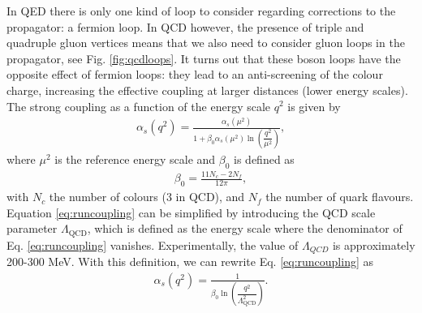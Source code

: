     In QED there is only one kind of loop to consider regarding corrections to the propagator: a fermion loop. In QCD however, the presence of triple and quadruple gluon vertices means that we also need to consider gluon loops in the propagator, see Fig. \ref{fig:qcdloops}. It turns out that these boson loops have the opposite effect of fermion loops: they lead to an anti-screening of the colour charge, increasing the effective coupling at larger distances (lower energy scales). The strong coupling as a function of the energy scale $q^2$ is given by 
    \begin{align}
      \alpha_s(q^2) = \frac{\alpha_s(\mu^2)}{1 + \beta_0\alpha_s(\mu^2)\ln\left(\dfrac{q^2}{\mu^2}\right)}, \label{eq:runcoupling}
    \end{align}
    where $\mu^2$ is the reference energy scale and $\beta_0$ is defined as
    \begin{align}
      \beta_0 = \frac{11N_c - 2N_f}{12\pi},  \label{eq:beta0}
    \end{align}
    with $N_c$ the number of colours (3 in QCD), and $N_f$ the number of quark flavours. Equation \ref{eq:runcoupling} can be simplified by introducing the QCD scale parameter $\Lambda_\text{QCD}$, which is defined as the energy scale where the denominator of Eq. \ref{eq:runcoupling} vanishes. Experimentally, the value of $\Lambda_{QCD}$ is approximately 200-300 MeV. With this definition, we can rewrite Eq. \ref{eq:runcoupling} as
    \begin{align}
      \alpha_s(q^2) = \frac{1}{\beta_0\ln\left(\dfrac{q^2}{\Lambda_\text{QCD}^2}\right)}. \label{eq:runcouplingsimplified}
    \end{align}
